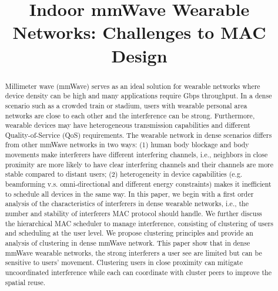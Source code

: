 \documentclass[10pt, conference, letterpaper]{IEEEtran}
\begin{document}
\title{Indoor mmWave Wearable Networks: Challenges to MAC Design}

\author{
}

\maketitle

\begin{abstract}
Millimeter wave (mmWave) serves as an ideal solution for wearable networks where device density can be high and many applications require Gbps throughput. In a dense scenario such as a crowded train or stadium, users with wearable personal area networks are close to each other and the interference can be strong. Furthermore, wearable devices may have heterogeneous transmission capabilities and different Quality-of-Service (QoS) requirements. The wearable network in dense scenarios differs from other mmWave networks in two ways: (1) human body blockage and body movements make interferers have different interfering channels, i.e., neighbors in close proximity are more likely to have clear interfering channels and their channels are more stable compared to distant users; (2) heterogeneity in device capabilities (e.g. beamforming v.s. omni-directional and different energy constraints) makes it inefficient to schedule all devices in the same way. In this paper, we begin with a first order analysis of the characteristics of interferers in dense wearable networks, i.e., the number and stability of interferers MAC protocol should handle. We further discuss the hierarchical MAC scheduler to manage interference, consisting of clustering of users and scheduling at the user level. We propose clustering principles and provide an analysis of clustering in dense mmWave network. This paper show that in dense mmWave wearable networks, the strong interferers a user see are limited but can be sensitive to users' movement. Clustering users in close proximity can mitigate uncoordinated interference while each can coordinate with cluster peers to improve the spatial reuse.

\end{abstract}
\IEEEpeerreviewmaketitle
\end{document}
